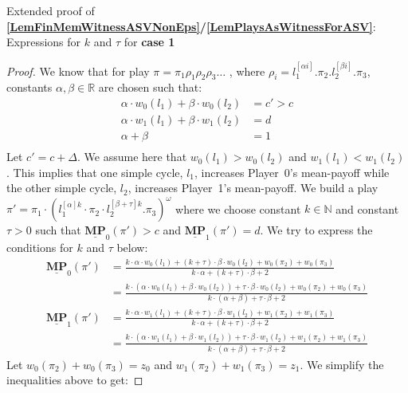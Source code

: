 \begin{lemma}
\label{LemExtProofOfFinMemforASV}
Extended proof of \textbf{\cref{LemFinMemWitnessASVNonEps}/\cref{LemPlaysAsWitnessForASV}}: Expressions for $k$ and $\tau$ for \textbf{case 1}
\end{lemma}
\begin{proof}
We know that for play $\pi = \pi_1\rho_1\rho_2\rho_3\dots$ , where $\rho_i = l_1^{[\alpha i]}.\pi_2.l_2^{[\beta i]}.\pi_3$, constants $\alpha, \beta \in \mathbb{R}$ are chosen such that: 
\begin{align*}
    \alpha \cdot w_0(l_1) + \beta \cdot w_0(l_2) &= c' > c \\
    \alpha \cdot w_1(l_1) + \beta \cdot w_1(l_2) &= d \\
    \alpha + \beta &= 1 \\
\end{align*}
Let $c' = c + \Delta$. We assume here that $w_0(l_1) > w_0(l_2)$ and $w_1(l_1) < w_1(l_2)$. This implies that one simple cycle, $l_1$, increases Player~0's mean-payoff while the other simple cycle, $l_2$, increases Player~1's mean-payoff. We build a play $\pi' = \pi_1 \cdot (l_1^{[\alpha]k} \cdot \pi_2 \cdot l_2^{[\beta+\tau]k}.\pi_3)^{\omega}$ where we choose constant $k \in \mathbb{N}$ and constant $\tau > 0$ such that $\underline{\mathbf{MP}}_0(\pi') > c$ and $\underline{\mathbf{MP}}_1(\pi') = d$. We try to express the conditions for $k$ and $\tau$ below:
\begin{align*}
    \underline{\mathbf{MP}}_0(\pi') &= \frac{k\cdot\alpha\cdot w_0(l_1) + (k + \tau) \cdot \beta \cdot w_0(l_2) + w_0(\pi_2) + w_0(\pi_3)}{k\cdot\alpha + (k+\tau)\cdot\beta + 2}\\
    &= \frac{k\cdot(\alpha\cdot w_0(l_1) + \beta \cdot w_0(l_2)) + \tau \cdot \beta \cdot w_0(l_2) + w_0(\pi_2) + w_0(\pi_3)}{k\cdot(\alpha + \beta) + \tau\cdot\beta + 2}\\
    \underline{\mathbf{MP}}_1(\pi') &= \frac{k\cdot\alpha\cdot w_1(l_1) + (k + \tau) \cdot \beta \cdot w_1(l_2) + w_1(\pi_2) + w_1(\pi_3)}{k\cdot\alpha + (k+\tau)\cdot\beta + 2}\\
    &= \frac{k\cdot(\alpha\cdot w_1(l_1) + \beta \cdot w_1(l_2)) + \tau \cdot \beta \cdot w_1(l_2) + w_1(\pi_2) + w_1(\pi_3)}{k\cdot(\alpha + \beta) + \tau\cdot\beta + 2}
\end{align*}
Let $w_0(\pi_2) + w_0(\pi_3) = z_0$ and $w_1(\pi_2) + w_1(\pi_3) = z_1$. We simplify the inequalities above to get:


\end{proof}

